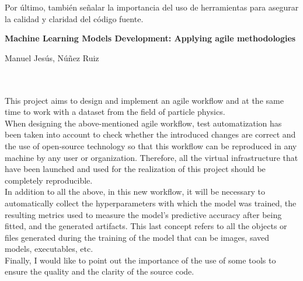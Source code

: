 Por último, también señalar la importancia del uso de herramientas para asegurar la calidad y claridad del código fuente.
\cleardoublepage


\thispagestyle{empty}


\begin{center}
{\large\bfseries Machine Learning Models Development: Applying agile methodologies}\\
\end{center}
\begin{center}
Manuel Jesús, Núñez Ruiz\\
\end{center}

\\

\vspace{0.7cm}
\\

This project aims to design and implement an agile workflow and at the same time to work with a dataset from the field of particle physics.\\

When designing the above-mentioned agile workflow, test automatization has been taken into account to check whether the introduced changes are correct and the use of open-source technology so that this workflow can be reproduced in any machine by any user or organization. Therefore, all the virtual infrastructure that have been launched and used for the realization of this project should be completely reproducible.\\

In addition to all the above, in this new workflow, it will be necessary to automatically collect the hyperparameters with which the model was trained, the resulting metrics used to measure the model's predictive accuracy after being fitted, and the generated artifacts. This last concept refers to all the objects or files generated during the training of the model that can be images, saved models, executables, etc.\\

Finally, I would like to point out the importance of the use of some tools to ensure the quality and the clarity of the source code.

\chapter*{}
\thispagestyle{empty}

